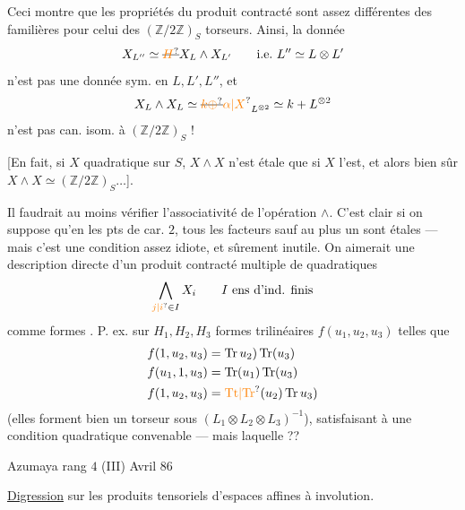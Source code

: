 Ceci montre que les propriétés du produit contracté sont assez différentes des   familières pour celui des $(\mathbb Z/2\mathbb Z)_S$ torseurs. Ainsi, la donnée
\[
 X_{L''}\simeq\deleted{\unsure{H}}X_L\wedge X_{L'}\qquad\text{i.e.}\ L''\simeq L\otimes L'
\]
n'est pas une donnée sym. en $L,L',L''$, et
\[
 X_L\wedge X_L\simeq\deleted{\unsure{k\oplus}}\unsure{\alpha|X}_{L^{\otimes2}}\simeq k+L^{\otimes2}
\]
n'est pas can. isom. à $(\mathbb Z/2\mathbb Z)_S$ !

[En fait, si $X$ quadratique sur $S$, $X\wedge X$ n'est étale que si $X$ l'est, et alors bien sûr $X\wedge X\simeq(\mathbb Z/2\mathbb Z)_S\ldots$].

Il faudrait au moins vérifier\margin{\unsure{!!|!}} l'associativité de l'opération $\wedge$.  C'est clair si on suppose qu'en les pts de car. $2$, tous les facteurs sauf au plus un sont étales --- mais c'est une condition assez idiote, et sûrement inutile. On  aimerait une description directe d'un produit contracté multiple de  quadratiques
\[
 \bigwedge_{\unsure{j|i}\in I} X_i\qquad I\ \text{ens d'ind. finis}
\]
 comme formes . P. ex. sur $H_1,H_2,H_3$ formes trilinéaires  $f(u_1,u_2,u_3)$ telles que
\[
 \begin{aligned}
 f(1,u_2,u_3)&=\operatorname{Tr}u_2)\operatorname{Tr}(u_3)\\
 f(u_1,1,u_3)&=\operatorname{Tr}(u_1)\operatorname{Tr}(u_3)\\
 f(1,u_2,u_3)&=\unsure{\mathrm{Tt}|\mathrm{Tr}}(u_2)\operatorname{Tr}u_3)
 \end{aligned}
\]
(elles forment bien un torseur sous $(L_1\otimes L_2\otimes L_3)^{-1}$), satisfaisant à une condition quadratique convenable --- mais laquelle ??

Azumaya rang $4$ \quad (III) \hfill Avril $86$

\uline{Digression} sur les produits tensoriels d'espaces affines à involution.

